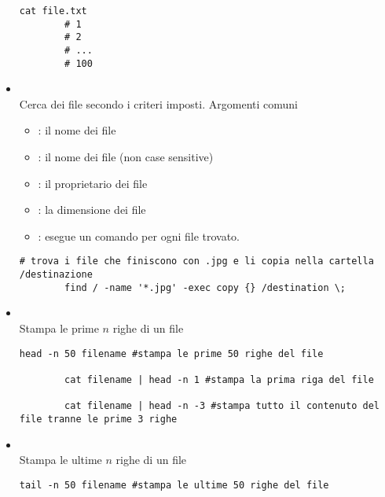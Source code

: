 \documentclass[../main.tex]{subfiles}
\begin{document}
\begin{itemize}
\begin{lstlisting}[style=bash]
        cat file.txt
        # 1
        # 2
        # ...
        # 100
    \end{lstlisting}
    \item {} \\
    Cerca dei file secondo i criteri imposti. Argomenti comuni
    \begin{itemize}
        \item {}: il nome dei file
        \item {}: il nome dei file (non case sensitive)
        \item {}: il proprietario dei file
        \item {}: la dimensione dei file
        \item {}: esegue un comando per ogni file trovato. 
    \end{itemize}
    \begin{lstlisting}[style=bash]
        # trova i file che finiscono con .jpg e li copia nella cartella /destinazione
        find / -name '*.jpg' -exec copy {} /destination \;
    \end{lstlisting}
    \item {} \\
    Stampa le prime $n$ righe di un file
    \begin{lstlisting}[style=bash]
        head -n 50 filename #stampa le prime 50 righe del file

        cat filename | head -n 1 #stampa la prima riga del file

        cat filename | head -n -3 #stampa tutto il contenuto del file tranne le prime 3 righe
    \end{lstlisting}
    \item {} \\
    Stampa le ultime $n$ righe di un file
    \begin{lstlisting}[style=bash]
        tail -n 50 filename #stampa le ultime 50 righe del file


\end{lstlisting}
\end{itemize}
\end{document}
